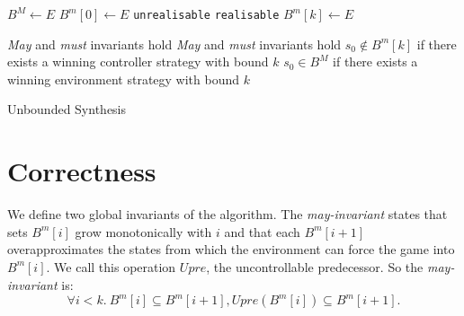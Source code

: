 \begin{algorithm}[h]
    \begin{algorithmic}[1]
            \State $B^M \gets E$
            \State $B^m[0] \gets E$
                    \State \Return \texttt{unrealisable} 
                \EndIf
                    \State \Return \texttt{realisable} 
                \EndIf
                \State $B^m[k] \gets E$
                \State {}
            \EndFor
        \EndFunction
    \end{algorithmic}

    \begin{algorithmic}
        \Require \emph{May} and \emph{must} invariants hold
        \Ensure \emph{May} and \emph{must} invariants hold
        \Ensure $s_0 \not\in B^m[k]$ if there exists a winning controller strategy with bound $k$
        \Ensure $s_0 \in B^M$ if there exists a winning environment strategy with bound $k$
            \State \Return {}
        \EndFunction
    \end{algorithmic}
    \caption{Unbounded Synthesis}
    \label{alg:unbounded}
\end{algorithm}



\section{Correctness}


We define two global invariants of the algorithm.  The \emph{may-invariant}
states that sets $B^m[i]$ grow monotonically with $i$ and that each $B^m[i+1]$
overapproximates the states from which the environment can force the game into
$B^m[i]$. We call this operation $Upre$, the uncontrollable predecessor. So the
\emph{may-invariant} is: $$\forall i<k.~B^m[i] \subseteq B^m[i+1], Upre(B^m[i])
\subseteq B^m[i+1].$$

